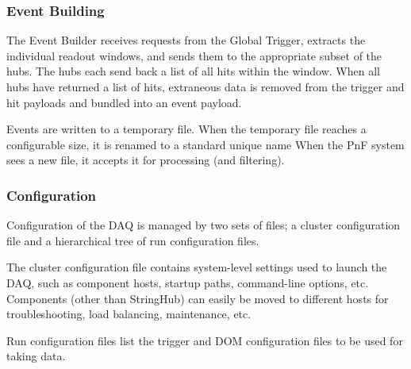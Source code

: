 
\subsubsection{\label{sect:online:evbuilder}Event Building}

The Event Builder receives requests from the Global Trigger, extracts
the individual readout windows, and sends them to the appropriate subset of the
hubs.  The hubs each send back a list of all hits within the window.  When all
hubs have returned a list of hits, extraneous data is removed from the trigger
and hit payloads and bundled into an event payload.

Events are written to a temporary file.  When the temporary
file reaches a configurable size, it is renamed to a standard unique name
When the PnF system sees a new file, it accepts it for
processing (and filtering).


\subsubsection{Configuration}

Configuration of the DAQ is managed by two sets of files; a cluster
configuration file and a hierarchical tree of run configuration files.

The cluster configuration file contains system-level settings used to launch
the DAQ, such as component hosts, startup paths, command-line options, etc.
Components
(other than StringHub) can easily be moved to different hosts for
troubleshooting, load balancing, maintenance, etc.

Run configuration files list the trigger and DOM configuration files to be
used for taking data.


